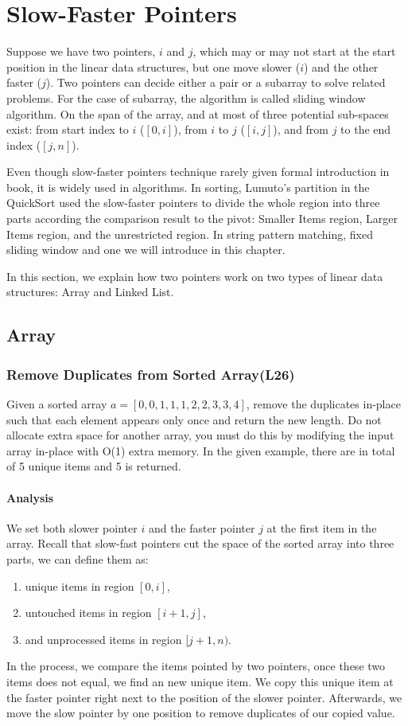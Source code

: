 \documentclass[../main.tex]{subfiles}
\begin{document}
\section{Slow-Faster Pointers}
Suppose we have two pointers, $i$ and $j$, which may or may not start at the start position in the linear data structures, but one move slower ($i$) and the other faster ($j$). Two pointers can decide either a pair or a subarray to solve related problems.  For the case of subarray, the algorithm is called sliding window algorithm. On the span of the array, and at most of three potential sub-spaces exist: from start index to $i$ ($[0, i]$), from $i$ to $j$ ($[i, j]$), and from $j$ to the end index ($[j, n]$).

Even though slow-faster pointers technique rarely given formal introduction in book, it is widely used in algorithms. In sorting, Lumuto's partition in the QuickSort used the slow-faster pointers to divide the whole region into three parts according the comparison result to the pivot: Smaller Items region, Larger Items region, and the unrestricted region. In string pattern matching, fixed sliding window and one we will introduce in this chapter. 

In this section, we explain how two pointers work on two types of linear data structures: Array and Linked List.
\subsection{Array}
\subsubsection{Remove Duplicates from Sorted Array(L26)} Given a sorted array $a=[0,0,1,1,1,2,2,3,3,4]$, remove the duplicates in-place such that each element appears only once and return the new length. Do not allocate extra space for another array, you must do this by modifying the input array in-place with O(1) extra memory. In the given example, there are in total of 5 unique items and 5 is returned. 
\paragraph{Analysis} We set both slower pointer $i$ and the faster pointer $j$ at the first item in the array. Recall that slow-fast pointers cut the space of the sorted array into three parts, we can define them as:
\begin{enumerate}
    \item unique items in region $[0, i]$,
    \item untouched items in region $[i+1, j]$,
    \item and unprocessed items in region $[j+1, n)$.
\end{enumerate}
In the process, we compare the items pointed by two pointers, once these two items does not equal, we find an new unique item. We copy this unique item at the faster pointer right next to the position of the slower pointer. Afterwards, we move the slow pointer by one position to remove duplicates of our copied value. 
\end{document}
